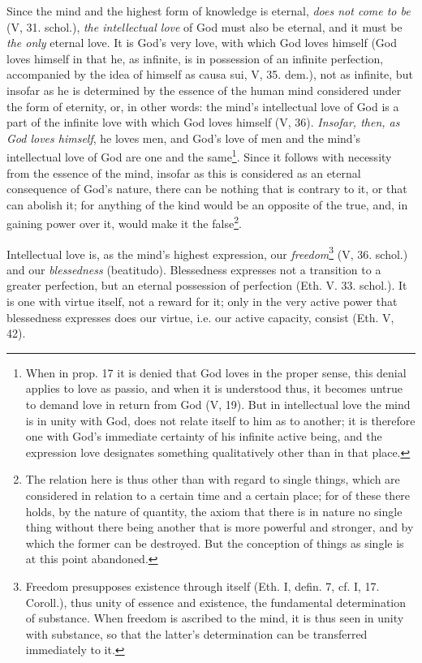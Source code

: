 \documentclass[12pt,a4paper,openany]{book}
\newcommand{\opage}[1]{\marginnote{\footnotesize\textit{[#1]}}}
\begin{document}
Since the mind and the highest form of knowledge is eternal,
\emph{does not come to be} (V, 31. schol.), \emph{the intellectual
love} of God must also be eternal, and it must
be \emph{the only} eternal love. It is God's very
love, with which God loves himself (God loves
himself in that he, as infinite, is in possession of an infinite
perfection, accompanied by the idea of himself as
\opage{169}\setcounter{footnote}{0}causa sui, V, 35. dem.), not as infinite, but insofar as
he is determined by the essence of the human mind considered
under the form of eternity, or, in other words:
the mind's intellectual love of God is a part of the
infinite love with which God loves himself (V,
36). \emph{Insofar, then, as God loves himself}, he loves
men, and God's love of men and the
mind's intellectual love of God are one and the
same\footnote{When in prop. 17 it is denied that God loves in the proper sense,
this denial applies to love as passio, and when it is
understood thus, it becomes untrue to demand love in return from God
(V, 19). But in intellectual love the mind is in unity
with God, does not relate itself to him as to another; it is therefore
one with God's immediate certainty of his infinite active being,
and the expression love designates something qualitatively other than in
that place.}. Since it follows with necessity from the essence of the
mind, insofar as this is considered as an eternal consequence of God's
nature, there can be nothing that is contrary to it,
or that can abolish it; for anything of the kind would be
an opposite of the true, and, in gaining power over
it, would make it the false\footnote{The relation here is thus other than with regard to single
things, which are considered in relation to a certain time and a certain place; for
of these there holds, by the nature of quantity, the axiom that there is in
nature no single thing without there being another
that is more powerful and stronger, and by which the former can be destroyed.
But the conception of things as single is at this point
abandoned.}.

Intellectual love is, as the mind's highest
expression, our \emph{freedom}\footnote{Freedom presupposes existence through itself (Eth. I, defin. 7, cf. I,
17. Coroll.), thus unity of essence and existence, the fundamental determination
of substance. When freedom is ascribed to the mind, it is thus
seen in unity with substance, so that the latter's determination can be
transferred immediately to it.} (V, 36. schol.) and our \emph{blessedness}
(beatitudo). Blessedness expresses not a transition to a
greater perfection, but an eternal possession of perfection
(Eth. V. 33. schol.). It is one with
\opage{170} virtue itself, not a reward for it; only in the very active
power that blessedness expresses does our virtue, i.e. our active
capacity, consist (Eth. V, 42).
\end{document}

